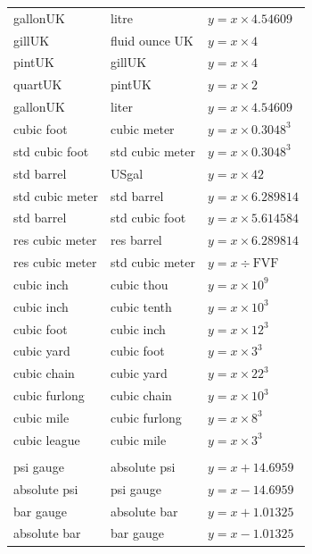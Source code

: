 \documentclass[11pt,a4paper]{report}
\begin{document}
{\begin{longtable}{l l l}
gallonUK          & litre             & $y = x \times 4.54609$ \\
gillUK            & fluid ounce UK    & $y = x \times 4$ \\
pintUK            & gillUK            & $y = x \times 4$ \\
quartUK           & pintUK            & $y = x \times 2$ \\
gallonUK          & liter             & $y = x \times 4.54609$ \\
cubic foot        & cubic meter       & $y = x \times 0.3048^{3}$ \\
std cubic foot    & std cubic meter   & $y = x \times 0.3048^{3}$ \\
std barrel        & USgal             & $y = x \times 42$ \\
std cubic meter   & std barrel        & $y = x \times 6.289814$ \\
std barrel        & std cubic foot    & $y = x \times 5.614584$ \\
res cubic meter   & res barrel        & $y = x \times 6.289814$ \\
res cubic meter   & std cubic meter   & $y = x \div \text{FVF}$ \rlap{$^{\dagger}$} \\
cubic inch        & cubic thou        & $y = x \times 10^{9}$ \\
cubic inch        & cubic tenth       & $y = x \times 10^{3}$ \\
cubic foot        & cubic inch        & $y = x \times 12^{3}$ \\
cubic yard        & cubic foot        & $y = x \times 3^{3}$ \\
cubic chain       & cubic yard        & $y = x \times 22^{3}$ \\
cubic furlong     & cubic chain       & $y = x \times 10^{3}$ \\
cubic mile        & cubic furlong     & $y = x \times 8^{3}$ \\
cubic league      & cubic mile        & $y = x \times 3^{3}$ \\
\addlinespace
\multicolumn{3}{l}{\textbf{Pressure}} \\
\midrule
psi gauge         & absolute psi      & $y = x + 14.6959$ \\
absolute psi      & psi gauge         & $y = x - 14.6959$ \\
bar gauge         & absolute bar      & $y = x + 1.01325$ \\
absolute bar      & bar gauge         & $y = x - 1.01325$ \\

\end{longtable}}
\end{document}
